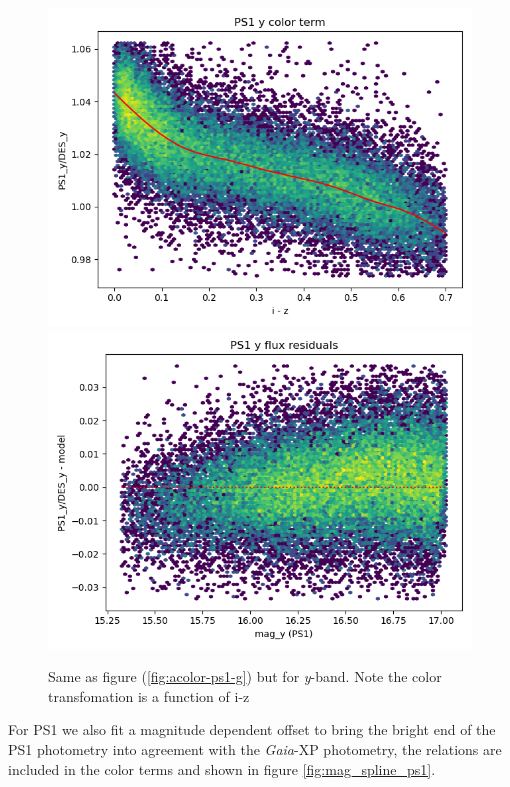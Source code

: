\begin{figure}
    \includegraphics[width=0.49\linewidth]{./figures/color_terms/PS1_to_DES_band_y_color_term.png}
    \includegraphics[width=0.49\linewidth]{./figures/color_terms/PS1_to_DES_band_y_flux_residuals.png}
    \caption{Same as figure (\ref{fig:acolor-ps1-g}) but for \textit{y}-band. Note the color transfomation is a function of i-z}
\end{figure}
For PS1 we also fit a magnitude dependent offset to bring the bright end of the PS1 photometry into agreement with the \emph{Gaia}-XP photometry, the relations are included in the color terms and shown in figure \ref{fig:mag_spline_ps1}. 
